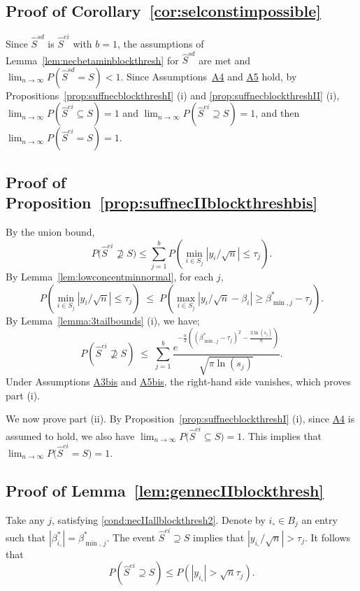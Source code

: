 \documentclass[
  12pt]{article}
\begin{document}
\subsection{Proof of Corollary~\ref{cor:selconstimpossible}}
Since $\hat{S}^{sd}$ is $\hat{S}^{ei}$ with $b=1$, the assumptions of Lemma~\ref{lem:necbetaminblockthresh} for $\hat{S}^{sd}$ are met and $\lim_{n \to \infty} P(\hat{S}^{sd} = S) < 1$. Since Assumptions~\hyperlink{lab:A4}{A4} and \hyperlink{lab:A5}{A5} hold, by Propositions~\ref{prop:suffnecblockthreshI} (i) and \ref{prop:suffnecblockthreshII} (i), $\lim_{n \to \infty} P(\hat{S}^{ei} \subseteq S)= 1$ and $\lim_{n \to \infty} P(\hat{S}^{ei} \supseteq S)= 1$, and then $\lim_{n \to \infty} P(\hat{S}^{ei} = S)= 1$.\color{black}


\subsection{Proof of Proposition~\ref{prop:suffnecIIblockthreshbis}}
 By the union bound, 
$$P\big(\hat{S}^{ei} \not\supseteq S\big)\leq \sum_{j=1}^b  P\left(\min_{i\in S_j}|y_i/\sqrt{n}|\leq\tau_j\right).$$ 
By Lemma~\ref{lem:lowconcentminnormal}, for each $j$,	
$$P\left(\min_{i\in S_j}|y_i/\sqrt{n}|\leq\tau_j\right)\;\leq\; P\left(\max_{i\in S_j}|y_i/\sqrt{n}-\beta_i| \geq\beta_{\min,j}^*-\tau_j \right).$$ By Lemma~\ref{lemma:3tailbounds} (i), we have;
\begin{equation}
P\left(\hat{S}^{ei}\not\supseteq S \right) \;\leq\;\sum_{j=1}^b\frac{e^{-\tfrac{n}{2}\left((\beta^*_{\min,j}-\tau_j)^2-\tfrac{2\ln(s_j)}{n}\right)}}{\sqrt{\pi\ln(s_j)}}.		
\end{equation}
Under Assumptions \hyperlink{lab:A3bis}{A3bis} and \hyperlink{lab:A5bis}{A5bis}, %
the right-hand side vanishes, which proves part (i). 

We now prove part (ii). By Proposition~\ref{prop:suffnecblockthreshI} (i), since \hyperlink{lab:A4}{A4} is assumed to hold, we also have $\lim_{n\to\infty}P\big(\hat{S}^{ei} \subseteq S\big)=1$. This implies that $\lim_{n\to\infty}P\big(\hat{S}^{ei} = S\big)= 1$.

\subsection{Proof of Lemma~\ref{lem:gennecIIblockthresh}}
Take any $j$, satisfying \eqref{cond:necIIallblockthresh2}. 
Denote by $i_{\circ}\in B_j$ an entry such that $|\beta_{i_{\circ}}^*|=\beta^*_{\min,\,j}$. 
The event $\hat{S}^{ei}\supseteq S$ implies that $|y_{i_{\circ}}/\sqrt{n}| > \tau_j$. It follows that
\begin{equation}\label{eq:AVFLKN}
    P(\hat{S}^{ei}\supseteq S) \leq  P(|y_{i_{\circ}}| > \sqrt{n}\tau_j). 
\end{equation}
\end{document}
